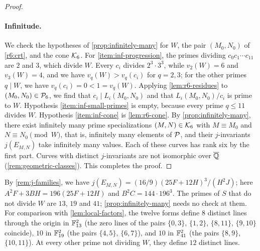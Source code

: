 \begin{proof}
\paragraph{Infinitude.} We check the hypotheses of \cref{prop:infinitely-many} for $W$, the pair $(M_0,N_0)$ of \eqref{r6:crt}, and the cone $\mathcal K_6$. For \ref{item:inf-progression}, the primes dividing $c_0c_1\cdots c_{11}$ are $2$ and $3$, which divide $W$. Every $c_i$ divides $2^3\cdot3^3$, while $v_2(W)=6$ and $v_3(W)=4$, and we have $v_q(W)>v_q(c_i)$ for $q=2,3$; for the other primes $q\mid W$, we have $v_q(c_i)=0<1=v_q(W)$. Applying \cref{lem:r6-residues} to $(M_0,N_0)\in\mathcal P_6$, we find that $c_i\mid L_i(M_0,N_0)$ and that $L_i(M_0,N_0)/c_i$ is prime to $W$. Hypothesis \ref{item:inf-small-primes} is empty, because every prime $q\le11$ divides $W$. Hypothesis \ref{item:inf-cone} is \cref{lem:r6-cone}. By \cref{prop:infinitely-many}, there exist infinitely many prime specializations $(M,N)\in\mathcal K_6$ with $M\equiv M_0$ and $N\equiv N_0\pmod W$, that is, infinitely many elements of $\mathcal P$, and their $j$-invariants $j(E_{M,N})$ take infinitely many values. Each of these curves has rank six by the first part. Curves with distinct $j$-invariants are not isomorphic over $\overline{\mathbb Q}$ (\cref{rem:geometric-classes}). This completes the proof.
\end{proof}

\begin{remark}\label{rem:r6-j}
By \cref{rem:j-families}, we have $j(E_{M,N})=(16/9)(25F+12H)^3/(H^2J)$; here $A^2F+3BH=196(25F+12H)$ and $B^2C=144\cdot196^3$. The primes of $S$ that do not divide $W$ are $13$, $19$ and $41$; \cref{prop:infinitely-many} needs no check at them. For comparison with \cref{lem:local-factors}, the twelve forms define $8$ distinct lines through the origin in $\mathbb F_{13}^2$ (the zero lines of the pairs $\{0,3\}$, $\{1,2\}$, $\{8,11\}$, $\{9,10\}$ coincide), $10$ in $\mathbb F_{19}^2$ (the pairs $\{4,5\}$, $\{6,7\}$), and $10$ in $\mathbb F_{41}^2$ (the pairs $\{8,9\}$, $\{10,11\}$). At every other prime not dividing $W$, they define $12$ distinct lines.
\end{remark}
